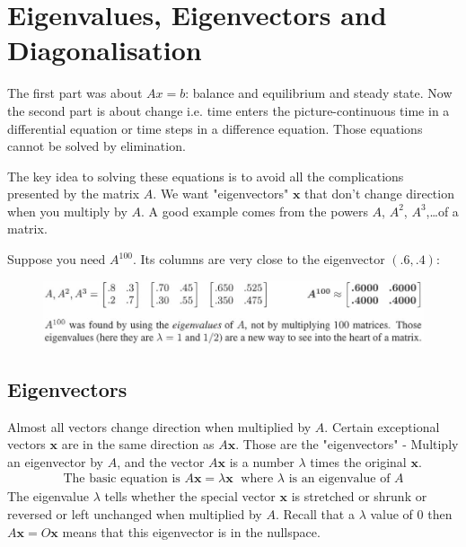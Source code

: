 \documentclass[10pt,a4paper]{article}
\begin{document}
\pagebreak

\section{Eigenvalues, Eigenvectors and Diagonalisation}

The first part was about $Ax  =  b$: balance and equilibrium and steady state. Now the second part
is about change i.e. time enters the picture-continuous time in a differential equation or time
steps in a difference equation. Those equations cannot be solved by elimination. 

The key idea to solving these equations is to avoid all the complications presented by the matrix
$A$. We want "eigenvectors" $\textbf{x}$ that don't change direction when you multiply by $A$. A
good example comes from the powers $A$, $A^2$, $A^3$,\dots of a matrix. 

Suppose you need $A^{100}$. Its columns are very close to the eigenvector $( .6,  .4)$: 
\begin{figure} [h!]
    \centering
    \includegraphics[scale=0.6]{Line.JPG}
\end{figure}

\subsection{Eigenvectors}

Almost all vectors change direction when multiplied by $A$. Certain exceptional vectors $\textbf{x}$
are in the same direction as $A \textbf{x}$. Those are the "eigenvectors" - Multiply an eigenvector by $A$,
and the vector $A \textbf{x}$ is a number $\lambda$ times the original $\textbf{x}$. 
\begin{align*}
    \text{The basic equation is } A \textbf{x} = \lambda \textbf{x} \; \text{ where } \lambda \text{ is an eigenvalue of } A 
\end{align*}
The eigenvalue $\lambda$ tells whether the special vector $\textbf{x}$ is stretched or shrunk or reversed or left
unchanged when multiplied by $A$. Recall that a $\lambda$ value of 0 then $A \textbf{x} = O \textbf{x}$ means that this eigenvector is in the nullspace. 
\end{document}
